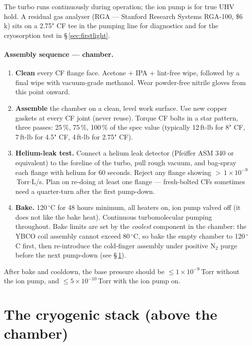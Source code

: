 \documentclass[11pt,letterpaper]{article}
\begin{document}
The turbo runs continuously during operation; the ion pump is for true UHV hold. A residual gas analyser (RGA --- Stanford Research Systems RGA-100, \$6\,k) sits on a 2.75" CF tee in the pumping line for diagnostics and for the cryosorption test in \S\,\ref{sec:firstlight}.

\paragraph{Assembly sequence --- chamber.}
\begin{enumerate}[leftmargin=1.6em]
  \item \textbf{Clean} every CF flange face. Acetone + IPA + lint-free wipe, followed by a final wipe with vacuum-grade methanol. Wear powder-free nitrile gloves from this point onward.
  \item \textbf{Assemble} the chamber on a clean, level work surface. Use new copper gaskets at every CF joint (never reuse). Torque CF bolts in a star pattern, three passes: 25\,\%, 75\,\%, 100\,\% of the spec value (typically 12\,ft-lb for 8" CF, 7\,ft-lb for 4.5" CF, 4\,ft-lb for 2.75" CF).
  \item \textbf{Helium-leak test.} Connect a helium leak detector (Pfeiffer ASM 340 or equivalent) to the foreline of the turbo, pull rough vacuum, and bag-spray each flange with helium for 60 seconds. Reject any flange showing $>$\,$1 \times 10^{-9}$\,Torr$\cdot$L/s. Plan on re-doing at least one flange --- fresh-bolted CFs sometimes need a quarter-turn after the first pump-down.
  \item \textbf{Bake.} 120\,$^\circ$C for 48 hours minimum, all heaters on, ion pump valved off (it does not like the bake heat). Continuous turbomolecular pumping throughout. Bake limits are set by the \textit{coolest} component in the chamber: the YBCO coil assembly cannot exceed 80\,$^\circ$C, so bake the empty chamber to 120\,$^\circ$C first, then re-introduce the cold-finger assembly under positive N$_2$ purge before the next pump-down (see \S\,\ref{sec:cryo}).
\end{enumerate}

After bake and cooldown, the base pressure should be $\leq 1 \times 10^{-9}$\,Torr without the ion pump, and $\leq 5 \times 10^{-10}$\,Torr with the ion pump on.

\section{The cryogenic stack (above the chamber)}
\label{sec:cryo}
\end{document}
